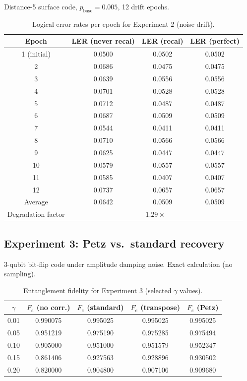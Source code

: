 \documentclass[12pt]{article}
\begin{document}
Distance-5 surface code, $p_{\text{base}} = 0.005$, 12 drift epochs.

\begin{table}[h]
\centering
\caption{Logical error rates per epoch for Experiment 2 (noise drift).}
\begin{tabular}{cccc}
\toprule
Epoch & LER (never recal) & LER (recal) & LER (perfect) \\
\midrule
1 (initial) & 0.0500 & 0.0502 & 0.0502 \\
2 & 0.0686 & 0.0475 & 0.0475 \\
3 & 0.0639 & 0.0556 & 0.0556 \\
4 & 0.0701 & 0.0528 & 0.0528 \\
5 & 0.0712 & 0.0487 & 0.0487 \\
6 & 0.0687 & 0.0509 & 0.0509 \\
7 & 0.0544 & 0.0411 & 0.0411 \\
8 & 0.0710 & 0.0566 & 0.0566 \\
9 & 0.0625 & 0.0447 & 0.0447 \\
10 & 0.0579 & 0.0557 & 0.0557 \\
11 & 0.0585 & 0.0407 & 0.0407 \\
12 & 0.0737 & 0.0657 & 0.0657 \\
\midrule
Average & 0.0642 & 0.0509 & 0.0509 \\
Degradation factor & \multicolumn{3}{c}{$1.29\times$} \\
\bottomrule
\end{tabular}
\end{table}

\subsection{Experiment 3: Petz vs.\ standard recovery}

3-qubit bit-flip code under amplitude damping noise. Exact calculation (no sampling).

\begin{table}[h]
\centering
\caption{Entanglement fidelity for Experiment 3 (selected $\gamma$ values).}
\begin{tabular}{ccccc}
\toprule
$\gamma$ & $F_e$ (no corr.) & $F_e$ (standard) & $F_e$ (transpose) & $F_e$ (Petz) \\
\midrule
0.01 & 0.990075 & 0.995025 & 0.995025 & 0.995025 \\
0.05 & 0.951219 & 0.975190 & 0.975285 & 0.975494 \\
0.10 & 0.905000 & 0.951000 & 0.951579 & 0.952347 \\
0.15 & 0.861406 & 0.927563 & 0.928896 & 0.930502 \\
0.20 & 0.820000 & 0.904800 & 0.907106 & 0.909680 \\
\bottomrule
\end{tabular}
\end{table}
\end{document}
